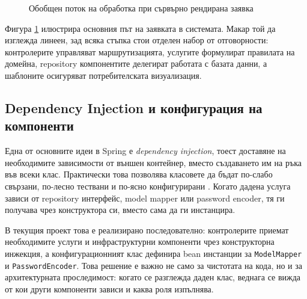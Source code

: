 \begin{figure}[H]
    \centering
    \caption{Обобщен поток на обработка при сървърно рендирана заявка}
    \label{fig:mvc-request-flow}
\end{figure}

Фигура \ref{fig:mvc-request-flow} илюстрира основния път на заявката в системата. Макар той да изглежда линеен, зад всяка стъпка стои отделен набор от отговорности: контролерите управляват маршрутизацията, услугите формулират правилата на домейна, repository компонентите делегират работата с базата данни, а шаблоните осигуряват потребителската визуализация.

\subsection{Dependency Injection и конфигурация на компоненти}

Една от основните идеи в Spring е \textit{dependency injection}, тоест доставяне на необходимите зависимости от външен контейнер, вместо създаването им на ръка във всеки клас. Практически това позволява класовете да бъдат по-слабо свързани, по-лесно тествани и по-ясно конфигурирани \cite{springboot}. Когато дадена услуга зависи от repository интерфейс, model mapper или password encoder, тя ги получава чрез конструктора си, вместо сама да ги инстанцира.

В текущия проект това е реализирано последователно: контролерите приемат необходимите услуги и инфраструктурни компоненти чрез конструкторна инжекция, а конфигурационният клас дефинира bean инстанции за \texttt{ModelMapper} и \texttt{PasswordEncoder}. Това решение е важно не само за чистотата на кода, но и за архитектурната проследимост: когато се разглежда даден клас, веднага се вижда от кои други компоненти зависи и каква роля изпълнява.

